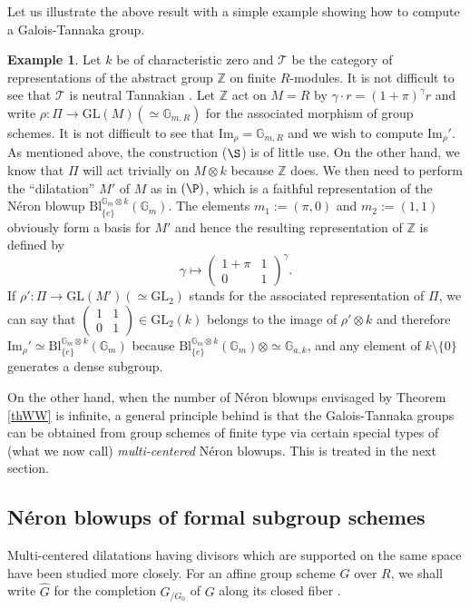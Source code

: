 \documentclass[10pt]{alggeom}
\theoremstyle{definition}
\newtheorem{ex}[thm]{Example}
\numberwithin{equation}{section}
\begin{document}
Let us illustrate the above result with a simple example showing how to compute a Galois-Tannaka group. 

\begin{ex}Let $k$ be of characteristic zero and  $\mathcal T$ be the category of representations of the abstract group $\mathbb Z$ on finite $R$-modules. It is not difficult to see that $\mathcal T$ is neutral Tannakian \cite[Corollary 4.5]{hai-dos_santos21}. Let $\mathbb Z$ act on  
$M=R$ by $\gamma\cdot r=(1+\pi)^\gamma r$ and write $\rho:\Pi\to   \mathrm{GL}(M)(\simeq\mathbb G_{m,R})$  for the associated morphism of group schemes. It is not difficult to see that $\mathrm{Im}_\rho=\mathbb G_{m,R}$ and we wish to compute $\mathrm{Im}_\rho'$. As mentioned above, the construction ($\S$) is of little use. On the other hand, we know that $\Pi$ will act trivially on   $M\otimes k$ because $\mathbb Z$ does. We then need to perform the ``dilatation'' $M'$ of $M$ as in $(\P)$, which is a faithful representation of the N\'eron blowup $\mathrm{Bl}_{\{e\}}^{\mathbb G_m\otimes k}(\mathbb G_m)$. The elements  $m_1:=(\pi,0)$ and $m_2:=(1,1)$ obviously form a basis for $M'$ and hence the resulting representation of $\mathbb Z$ is defined by 
\[
\gamma\longmapsto\begin{pmatrix}1+\pi&1\\0&1\end{pmatrix}^\gamma.
\] 
If $\rho':\Pi\to \mathrm{GL}(M')(\simeq \mathrm{GL}_2)$ stands for the associated representation of $\Pi$, we can say that $\begin{pmatrix}1&1\\0&1\end{pmatrix}\in\mathrm{GL}_2(k)$ belongs to the image of $\rho'\otimes k$ and therefore $\mathrm{Im}_\rho'\simeq\mathrm{Bl}_{\{e\}}^{\mathbb G_m\otimes k}(\mathbb G_m)$ because $\mathrm{Bl}_{\{e\}}^{\mathbb G_m\otimes k}(\mathbb G_m)\otimes\simeq\mathbb G_{a,k}$, and any  element  of $k\setminus\{0\}$  generates a dense subgroup. 
\end{ex}

On the other hand, when the number of N\'eron blowups envisaged by Theorem \ref{thWW} is infinite, 
a general principle behind \cite{duong-hai-dos_santos18, hai-dos_santos21} is that the  Galois-Tannaka groups can be obtained from group schemes of finite type  via certain special types of  (what we now call) {\it multi-centered}  N\'eron blowups.  This is treated in the next section. 

\subsection{  N\'eron blowups of formal subgroup schemes}\label{Tannak3}
Multi-centered dilatations having divisors which are supported on the same space have been studied more closely. For an affine  group scheme $G$ over $R$, we shall write $\widehat G$ for the completion $G_{/G_0}$ of $G$ along its closed fiber \cite[I.10]{EGA}.
\end{document}
